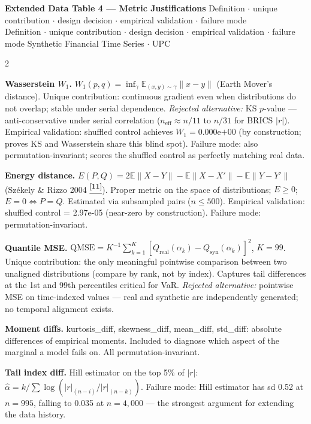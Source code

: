 \documentclass[10pt]{article}
\newcommand{\tealbox}[2]{\begin{tcolorbox}[mybox={Teal}{LBg},title={#1}]#2\end{tcolorbox}}
\newcommand{\purplebox}[2]{\begin{tcolorbox}[mybox={Purple}{LBg},title={#1}]#2\end{tcolorbox}}
\newcommand{\pagehead}[2]{%
  \begin{tcolorbox}[enhanced,arc=0pt,outer arc=0pt,boxrule=0pt,
    colback=Navy,colframe=Navy,
    top=5pt,bottom=5pt,left=8pt,right=8pt,
    before skip=0pt,after skip=10pt]
  {\color{white}\large\bfseries #1}%
  \ifx\relax#2\relax\else\\[1pt]{\color{blue!30!white}\small #2}\fi
  \hfill{\color{blue!20!white}\footnotesize Synthetic Financial Time Series $\cdot$ UPC}
  \end{tcolorbox}}
\newcommand{\tcite}[1]{%
  \hyperlink{R:#1}{\textsuperscript{\scriptsize\textbf{[#1]}}}}
\newcommand{\E}{\mathbb{E}}
\begin{document}
\clearpage

\pagehead{Extended Data Table 4 --- Metric Justifications}
         {Definition $\cdot$ unique contribution $\cdot$ design decision $\cdot$ empirical validation $\cdot$ failure mode}

\begin{multicols}{2}
\small

\tealbox{Fidelity Group: Wasserstein and Energy Distance}{%
\textbf{Wasserstein $W_1$.} $W_1(p,q) = \inf_\gamma \E_{(x,y)\sim\gamma}\|x-y\|$ (Earth Mover's distance). Unique contribution: continuous gradient even when distributions do not overlap; stable under serial dependence. \textit{Rejected alternative:} KS $p$-value --- anti-conservative under serial correlation ($n_\text{eff} \approx n/11$ to $n/31$ for BRICS $|r|$). Empirical validation: shuffled control achieves $W_1 = 0.000\text{e+00}$ (by construction; proves KS and Wasserstein share this blind spot). Failure mode: also permutation-invariant; scores the shuffled control as perfectly matching real data.

\smallskip
\textbf{Energy distance.} $E(P,Q) = 2\E\|X-Y\| - \E\|X-X'\| - \E\|Y-Y'\|$ (Sz\'{e}kely \& Rizzo 2004\tcite{11}). Proper metric on the space of distributions; $E \geq 0$; $E=0 \Leftrightarrow P=Q$. Estimated via subsampled pairs ($n \leq 500$). Empirical validation: shuffled control = 2.97e-05 (near-zero by construction). Failure mode: permutation-invariant.}

\purplebox{Fidelity Group: Quantile MSE and Moment/Tail Diffs}{%
\textbf{Quantile MSE.} $\text{QMSE} = K^{-1}\sum_{k=1}^K [Q_\text{real}(\alpha_k) - Q_\text{syn}(\alpha_k)]^2$, $K=99$. Unique contribution: the only meaningful pointwise comparison between two unaligned distributions (compare by rank, not by index). Captures tail differences at the 1st and 99th percentiles critical for VaR. \textit{Rejected alternative:} pointwise MSE on time-indexed values --- real and synthetic are independently generated; no temporal alignment exists.

\smallskip
\textbf{Moment diffs.} kurtosis\_diff, skewness\_diff, mean\_diff, std\_diff: absolute differences of empirical moments. Included to diagnose which aspect of the marginal a model fails on. All permutation-invariant.

\smallskip
\textbf{Tail index diff.} Hill estimator on the top 5\% of $|r|$: $\hat{\alpha} = k/\sum \log(|r|_{(n-i)}/|r|_{(n-k)})$. Failure mode: Hill estimator has sd 0.52 at $n=995$, falling to 0.035 at $n=4{,}000$ --- the strongest argument for extending the data history.}


\end{multicols}
\end{document}
